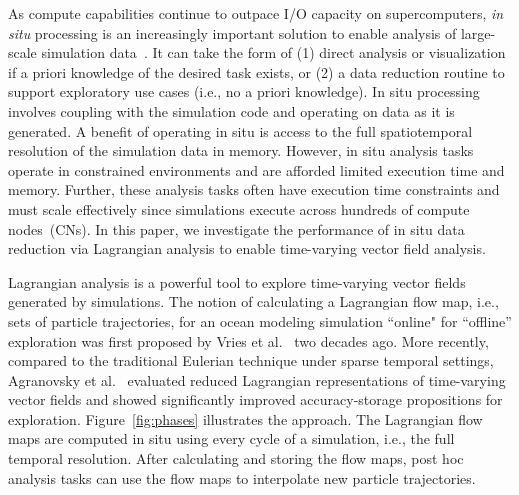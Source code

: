 As compute capabilities continue to outpace I/O capacity on supercomputers, \textit{in situ} processing is an increasingly important solution to enable analysis of large-scale simulation data~\cite{bauer2016situ}.
%
It can take the form of (1) direct analysis or visualization if a priori knowledge of the desired task exists, or (2) a data reduction routine to support exploratory use cases (i.e., no a priori knowledge). 
%
In situ processing involves coupling with the simulation code and operating on data as it is generated. 
%
A benefit of operating in situ is access to the full spatiotemporal resolution of the simulation data in memory.
%
However, in situ analysis tasks operate in constrained environments and are afforded limited execution time and memory.
%
Further, these analysis tasks often have execution time constraints and must scale effectively since simulations execute across hundreds of compute nodes~(CNs).
%
%
In this paper, we investigate the performance of in situ data reduction via Lagrangian analysis to enable time-varying vector field analysis.
%

Lagrangian analysis is a powerful tool to explore time-varying vector fields generated by simulations.
%
The notion of calculating a Lagrangian flow map, i.e., sets of particle trajectories, for an ocean modeling simulation ``online" for ``offline'' exploration was first proposed by Vries et al.~\cite{vries2001calculating} two decades ago.
%
More recently, compared to the traditional Eulerian technique under sparse temporal settings, Agranovsky et al.~\cite{agranovsky2014improved} evaluated reduced Lagrangian representations of time-varying vector fields and showed significantly improved accuracy-storage propositions for exploration. 
%
Figure~\ref{fig:phases} illustrates the approach.
%
The Lagrangian flow maps 
are computed in situ using every cycle of a simulation, i.e., the full temporal resolution.
%
After calculating and storing the flow maps, post hoc analysis tasks can use the flow maps to interpolate new particle trajectories.
%
%




